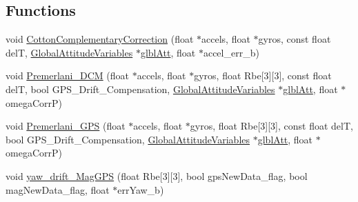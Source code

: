 \subsection*{\-Functions}
\begin{DoxyCompactItemize}
\item 
void \hyperlink{group___state_estimation_filters_ga91405b9ba2764857427c8d2d8d8a3226}{\-Cotton\-Complementary\-Correction} (float $\ast$accels, float $\ast$gyros, const float del\-T, \hyperlink{struct_global_attitude_variables}{\-Global\-Attitude\-Variables} $\ast$\hyperlink{group___c_c_state_ga76682d72011dc0109f1d5cf25a6c6da0}{glbl\-Att}, float $\ast$accel\-\_\-err\-\_\-b)
\item 
void \hyperlink{group___state_estimation_filters_gafac439746843ae2cfb6a4a053a66dc7e}{\-Premerlani\-\_\-\-D\-C\-M} (float $\ast$accels, float $\ast$gyros, float \-Rbe\mbox{[}3\mbox{]}\mbox{[}3\mbox{]}, const float del\-T, bool \-G\-P\-S\-\_\-\-Drift\-\_\-\-Compensation, \hyperlink{struct_global_attitude_variables}{\-Global\-Attitude\-Variables} $\ast$\hyperlink{group___c_c_state_ga76682d72011dc0109f1d5cf25a6c6da0}{glbl\-Att}, float $\ast$omega\-Corr\-P)
\item 
void \hyperlink{group___state_estimation_filters_ga688e0cf65377d9e7f81f303a1d5b96c7}{\-Premerlani\-\_\-\-G\-P\-S} (float $\ast$accels, float $\ast$gyros, float \-Rbe\mbox{[}3\mbox{]}\mbox{[}3\mbox{]}, const float del\-T, bool \-G\-P\-S\-\_\-\-Drift\-\_\-\-Compensation, \hyperlink{struct_global_attitude_variables}{\-Global\-Attitude\-Variables} $\ast$\hyperlink{group___c_c_state_ga76682d72011dc0109f1d5cf25a6c6da0}{glbl\-Att}, float $\ast$omega\-Corr\-P)
\item 
void \hyperlink{group___state_estimation_filters_ga81766afbca58a5d4fc811c0727f3bdf2}{yaw\-\_\-drift\-\_\-\-Mag\-G\-P\-S} (float \-Rbe\mbox{[}3\mbox{]}\mbox{[}3\mbox{]}, bool gps\-New\-Data\-\_\-flag, bool mag\-New\-Data\-\_\-flag, float $\ast$err\-Yaw\-\_\-b)
\end{DoxyCompactItemize}
